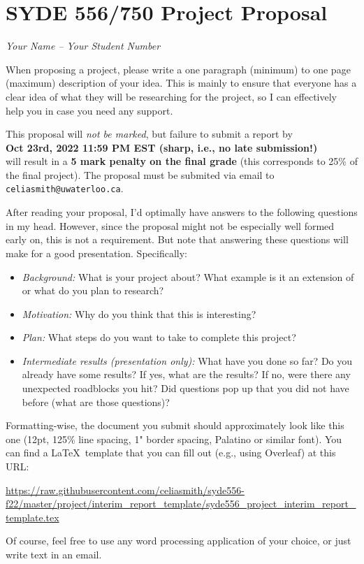 \documentclass[12pt,letterpaper,oneside]{article}
\begin{document}
	\section*{SYDE 556/750 Project Proposal}

	\emph{Your Name -- Your Student Number}

	When proposing a project, please write a one paragraph (minimum) to one page (maximum) description of your idea. This is mainly to ensure that everyone has a clear idea of what they will be researching for the project, so I can effectively help you in case you need any support.

  This proposal will \emph{not be marked}, but failure to submit a report by\\[0.25cm]
	{\centering\bf Oct 23rd, 2022 11:59 PM EST (sharp, i.e., no late submission!)\\[0.25cm]}
	will result in a \textbf{5 mark penalty on the final grade} (this corresponds to 25\% of the final project). The proposal must be submited via email to \texttt{celiasmith@uwaterloo.ca}.

	After reading your proposal, I'd optimally have answers to the following questions in my head. However, since the proposal might not be especially well formed early on, this is not a requirement. But note that answering these questions will make for a good presentation.  Specifically:
	\begin{itemize}
		\item \emph{Background:} What is your project about? What example is it an extension of or what do you plan to research?
		\item \emph{Motivation:} Why do you think that this is interesting?
		\item \emph{Plan:} What steps do you want to take to complete this project?
		\item \emph{Intermediate results (presentation only):} What have you done so far? Do you already have some results? If yes, what are the results? If no, were there any unexpected roadblocks you hit? Did questions pop up that you did not have before (what are those questions)?
	\end{itemize}

	Formatting-wise, the document you submit should approximately look like this one (12pt, 125\% line spacing, 1" border spacing, Palatino or similar font). You can find a \LaTeX\ template that you can fill out (e.g., using Overleaf) at this URL:
	\begin{center}
		\small
		\url{https://raw.githubusercontent.com/celiasmith/syde556-f22/master/project/interim_report_template/syde556_project_interim_report_template.tex}
	\end{center}

	Of course, feel free to use any word processing application of your choice, or just write text in an email.
\end{document}
